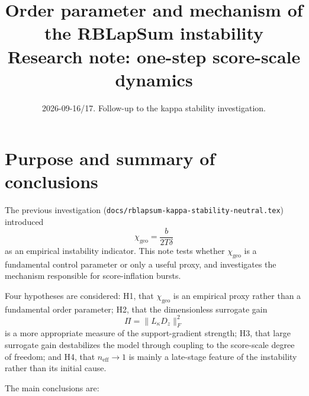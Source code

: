 \documentclass[11pt,a4paper]{article}
\title{Order parameter and mechanism of the RBLapSum
\code{through\_rank\_kappa} instability\\[2pt]
\large Research note: one-step score-scale dynamics}
\author{}
\date{2026-09-16/17. Follow-up to the kappa stability investigation.}
\newcommand{\code}[1]{\texttt{#1}}
\newcommand{\neff}{n_{\mathrm{eff}}}
\newcommand{\chigeo}{\chi_{\mathrm{geo}}}
\newcommand{\Pisurr}{\Pi}
\begin{document}
\maketitle
\vspace{-2em}
\tableofcontents

\section{Purpose and summary of conclusions}

The previous investigation
(\code{docs/rblapsum-kappa-stability-neutral.tex}) introduced
\[
\chigeo=\frac{b}{2T\delta}
\]
as an empirical instability indicator. This note tests whether \(\chigeo\) is a fundamental control parameter or only a useful proxy, and investigates the mechanism responsible for score-inflation bursts.

Four hypotheses are considered: H1, that \(\chigeo\) is an empirical proxy rather than a fundamental order parameter; H2, that the dimensionless surrogate gain
\[
\Pisurr=\|L_\kappa D_z\|_F^2
\]
is a more appropriate measure of the support-gradient strength; H3, that large surrogate gain destabilizes the model through coupling to the score-scale degree of freedom; and H4, that \(\neff\to1\) is mainly a late-stage feature of the instability rather than its initial cause.

The main conclusions are:
\end{document}
